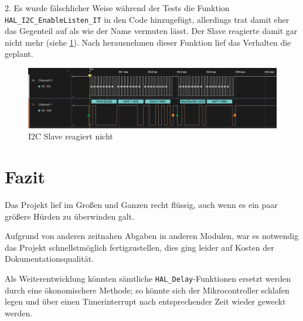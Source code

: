 \documentclass[11pt,a4paper,titlepage]{article}
\begin{document}
2. Es wurde fälschlicher Weise während der Tests die Funktion \texttt{HAL\_I2C\_EnableListen\_IT} in den Code hinzugefügt,
allerdings trat damit eher das Gegenteil auf als wie der Name vermuten lässt.
Der Slave reagierte damit gar nicht mehr (siehe \cref{fig:no_response}).
Nach herausnehmen dieser Funktion lief das Verhalten die geplant.

\begin{figure}[H]
    \begin{center}
        \includegraphics[width=\textwidth]{Bilder-Tobit/i2c-problem_no-slave-response.png}
        \caption{I2C Slave reagiert nicht}
        \label{fig:no_response}
    \end{center}
\end{figure}

\section{Fazit}
Das Projekt lief im Großen und Ganzen recht flüssig, auch wenn es ein paar größere Hürden zu überwinden galt.

Aufgrund von anderen zeitnahen Abgaben in anderen Modulen, war es notwendig das Projekt schnellstmöglich fertigzustellen,
dies ging leider auf Kosten der Dokumentationsqualität.

Als Weiterentwicklung könnten sämtliche \texttt{HAL\_Delay}-Funktionen ersetzt werden durch eine ökonomischere Methode;
so könnte sich der Mikrocontroller schlafen legen und über einen Timerinterrupt nach entsprechender Zeit wieder geweckt werden.
\end{document}
